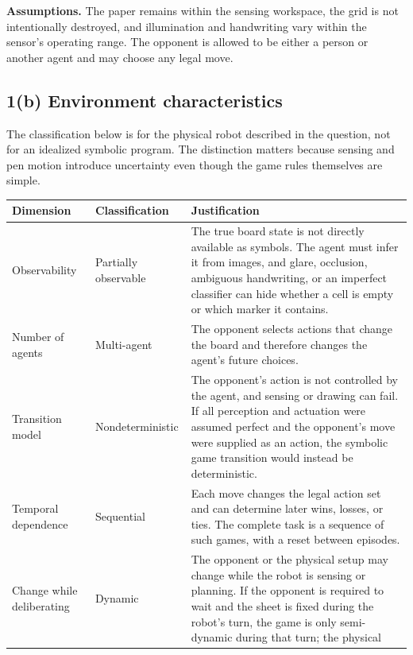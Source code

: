 \documentclass[11pt]{article}
\renewcommand{\arraystretch}{1.25}
\begin{document}
\textbf{Assumptions.} The paper remains within the sensing workspace, the grid
is not intentionally destroyed, and illumination and handwriting vary within
the sensor's operating range.  The opponent is allowed to be either a person
or another agent and may choose any legal move.

\subsection*{1(b) Environment characteristics}
The classification below is for the physical robot described in the question,
not for an idealized symbolic program.  The distinction matters because sensing
and pen motion introduce uncertainty even though the game rules themselves are
simple.

{\footnotesize
\renewcommand{\arraystretch}{1.10}
\begin{center}
\begin{tabular}{>{\raggedright\arraybackslash}p{}
                >{\raggedright\arraybackslash}p{}
                >{\raggedright\arraybackslash}p{}}
\toprule
\textbf{Dimension} & \textbf{Classification} & \textbf{Justification}\\
\midrule
Observability & Partially observable &
The true board state is not directly available as symbols.  The agent must infer
it from images, and glare, occlusion, ambiguous handwriting, or an imperfect
classifier can hide whether a cell is empty or which marker it contains.\\
\addlinespace
Number of agents & Multi-agent &
The opponent selects actions that change the board and therefore changes the
agent's future choices.\\
\addlinespace
Transition model & Nondeterministic &
The opponent's action is not controlled by the agent, and sensing or drawing can
fail.  If all perception and actuation were assumed perfect and the opponent's
move were supplied as an action, the symbolic game transition would instead be
deterministic.\\
\addlinespace
Temporal dependence & Sequential &
Each move changes the legal action set and can determine later wins, losses, or
ties.  The complete task is a sequence of such games, with a reset between
episodes.\\
\addlinespace
Change while deliberating & Dynamic &
The opponent or the physical setup may change while the robot is sensing or
planning.  If the opponent is required to wait and the sheet is fixed during
the robot's turn, the game is only semi-dynamic during that turn; the physical

\end{tabular}
\end{center}}
\end{document}
